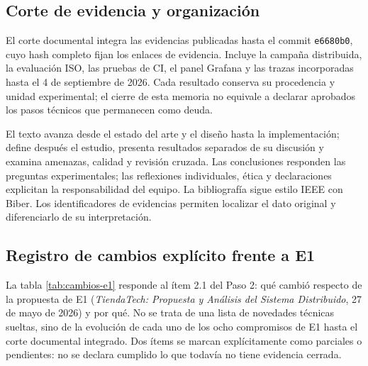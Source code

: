\documentclass[12pt,a4paper]{article}
\begin{document}
\subsection{Corte de evidencia y organización}
El corte documental integra las evidencias publicadas hasta el commit \texttt{e6680b0}, cuyo hash completo fijan los enlaces de evidencia. Incluye la campaña distribuida, la evaluación ISO, las pruebas de CI, el panel Grafana y las trazas incorporadas hasta el 4 de septiembre de 2026. Cada resultado conserva su procedencia y unidad experimental; el cierre de esta memoria no equivale a declarar aprobados los pasos técnicos que permanecen como deuda.

El texto avanza desde el estado del arte y el diseño hasta la implementación; define después el estudio, presenta resultados separados de su discusión y examina amenazas, calidad y revisión cruzada. Las conclusiones responden las preguntas experimentales; las reflexiones individuales, ética y declaraciones explicitan la responsabilidad del equipo. La bibliografía sigue estilo IEEE con Biber. Los identificadores de evidencias permiten localizar el dato original y diferenciarlo de su interpretación.
\subsection{Registro de cambios explícito frente a E1}
La tabla \ref{tab:cambios-e1} responde al ítem 2.1 del Paso 2: qué cambió respecto de la propuesta de E1 (\emph{TiendaTech: Propuesta y Análisis del Sistema Distribuido}, 27 de mayo de 2026) y por qué. No se trata de una lista de novedades técnicas sueltas, sino de la evolución de cada uno de los ocho compromisos de E1 hasta el corte documental integrado. Dos ítems se marcan explícitamente como parciales o pendientes: no se declara cumplido lo que todavía no tiene evidencia cerrada.
\end{document}
